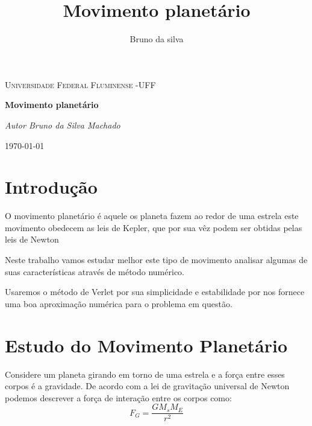 \documentclass[a4paper]{article} %
\begin{document}

\title{Movimento planetário}
\author{Bruno da silva}

\selectfont
\begin{titlepage}
	\begin{center}
		{\scshape\Large Universidade Federal Fluminense -UFF \par}
		\vspace{7cm}
		{\huge\bfseries Movimento planetário \par}
		\vspace{5.5cm}
		{\itshape Autor Bruno da Silva Machado \par}      
		
		\vspace{6.5cm}    
		
		\vfill
		{\large \today\par}
	\end{center}
\end{titlepage}
\setcounter{secnumdepth}{0}

\section{Introdu\c{c}\~{a}o}

\noindent

O movimento planet\'{a}rio \'{e} aquele os planeta fazem ao redor de uma estrela este movimento obedecem as leis de Kepler, que por sua v\^{e}z podem ser obtidas pelas leis de Newton

Neste trabalho vamos estudar melhor este tipo de movimento analisar algumas de suas caracter\'{i}sticas atrav\'{e}s de m\'{e}todo num\'{e}rico.

Usaremos o m\'{e}todo de Verlet por sua simplicidade e estabilidade por nos fornece uma boa aproxima\c{c}\~{a}o num\'{e}rica para o problema em questão.

\noindent 
\section{Estudo do Movimento Planet\'{a}rio}

\noindent 

Considere um planeta girando em torno de uma estrela e a for\c{c}a entre esses corpos \'e a gravidade. De acordo com a lei de gravita\c{c}\~{a}o universal de Newton podemos descrever a for\c{c}a de intera\c{c}\~{a}o entre os corpos como:
\[F_G = \frac{GM_sM_E}{r^{2}}\]
\end{document}
